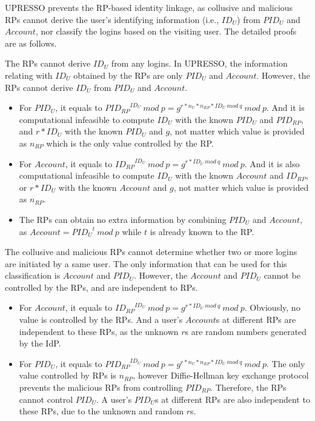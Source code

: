 UPRESSO prevents the RP-based identity linkage, as collusive and malicious RPs cannot derive the user's identifying information (i.e., $ID_U$) from $PID_U$ and $Account$, nor classify the logins based on the visiting user.
The detailed proofs are as follows.

The RPs cannot derive $ID_U$ from any logins. In UPRESSO, the information relating with $ID_U$ obtained by the RPs are only $PID_{U}$ and $Account$. However, the RPs cannot derive $ID_U$ from $PID_U$ and $Account$.
\begin{itemize}
  \item For $PID_U$, it equals to ${PID_{RP}}^{ID_U}\ mod\ p=g^{r*n_U*n_{RP}*ID_U\ mod\ q}\ mod\ p$. And it is computational infeasible to compute $ID_U$ with the known $PID_U$ and $PID_{RP}$, and $r*ID_U$ with the known $PID_U$ and $g$, not matter which value is provided  as $n_{RP}$ which is the only value controlled by the RP.
  \item For $Account$, it equals to ${ID_{RP}}^{ID_U}\ mod\ p=g^{r*ID_U\ mod\ q}\ mod\ p$. And it is also computational infeasible to compute $ID_U$ with the known $Account$ and $ID_{RP}$, or $r*ID_U$ with the known $Account$ and $g$, not matter which value is provided  as $n_{RP}$.
  \item The RPs can obtain no extra information by combining $PID_U$ and $Account$, as $Account= {PID_U}^t\ mod\ p$ while $t$ is already known to the RP.
\end{itemize}

The collusive and malicious RPs cannot determine whether two or more logins are initiated by a same user. The only information  that can be used for this
classification is $Account$ and $PID_U$.
However,  the $Account$ and $PID_U$ cannot be controlled by the RPs, and are independent to RPs.
\begin{itemize}
  \item For $Account$, it equals to ${ID_{RP}}^{ID_U}\ mod\ p=g^{r*ID_U\ mod\ q}\ mod\ p$. Obviously, no value is controlled by the RPs. And a user's $Account$s at different RPs are independent to these RPs, as the unknown $r$s are   random numbers generated by the IdP.
  \item For $PID_U$, it equals to ${PID_{RP}}^{ID_U}\ mod\ p=g^{r*n_U*n_{RP}*ID_U\ mod\ q}\ mod\ p$. The only value controlled by RPs is $n_{RP}$, however Diffie-Hellman key exchange protocol prevents the malicious RPs from controlling $PID_{RP}$. Therefore, the RPs cannot control $PID_U$. A user's $PID_U$s at different RPs are also independent to these RPs, due to the unknown and random $r$s.
\end{itemize}




